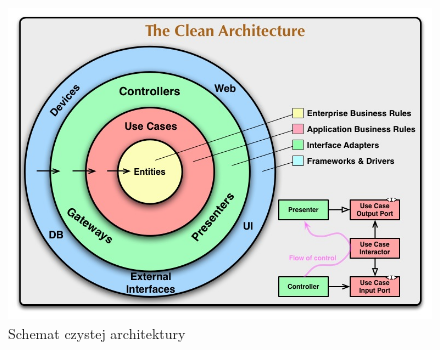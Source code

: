                                                                   











                                                                   











                                                                   











  \begin{figure}[H]
    \centering
    \includegraphics[width=1\linewidth]{pictures/clean_architecture}
    \caption{Schemat czystej architektury\cite{clean_architecture}}
    \label{fig:clean_architecture}
  \end{figure}


                                                                   











                                                                   












